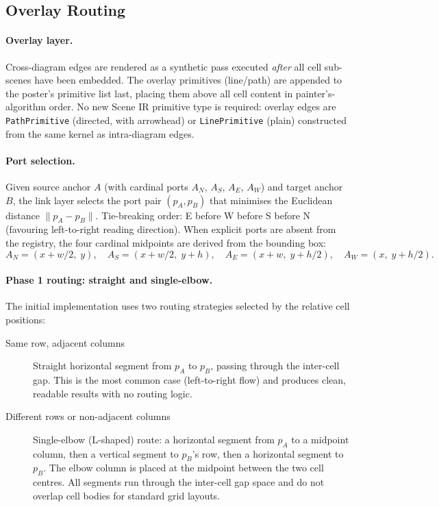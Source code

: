 \subsection{Overlay Routing}
\label{sec:cdl-overlay-routing}

\paragraph{Overlay layer.}

Cross-diagram edges are rendered as a synthetic pass executed \emph{after} all
cell sub-scenes have been embedded.  The overlay primitives (line/path) are
appended to the poster's primitive list last, placing them above all cell
content in painter's-algorithm order.  No new Scene IR primitive type is
required: overlay edges are \texttt{PathPrimitive} (directed, with arrowhead)
or \texttt{LinePrimitive} (plain) constructed from the same kernel as
intra-diagram edges.

\paragraph{Port selection.}

Given source anchor $A$ (with cardinal ports $A_N$, $A_S$, $A_E$, $A_W$) and
target anchor $B$, the link layer selects the port pair $(p_A, p_B)$ that
minimises the Euclidean distance $\|p_A - p_B\|$.  Tie-breaking order: E
before W before S before N (favouring left-to-right reading direction).  When
explicit ports are absent from the registry, the four cardinal midpoints are
derived from the bounding box:
\[
  A_N = (x + w/2,\; y), \quad
  A_S = (x + w/2,\; y+h), \quad
  A_E = (x+w,\; y+h/2), \quad
  A_W = (x,\; y+h/2).
\]

\paragraph{Phase 1 routing: straight and single-elbow.}

The initial implementation uses two routing strategies selected by the
relative cell positions:

\begin{description}
  \item[Same row, adjacent columns] Straight horizontal segment from $p_A$
        to $p_B$, passing through the inter-cell gap.  This is the most common
        case (left-to-right flow) and produces clean, readable results with no
        routing logic.

  \item[Different rows or non-adjacent columns] Single-elbow (L-shaped) route:
        a horizontal segment from $p_A$ to a midpoint column, then a vertical
        segment to $p_B$'s row, then a horizontal segment to $p_B$.  The
        elbow column is placed at the midpoint between the two cell centres.
        All segments run through the inter-cell gap space and do not overlap
        cell bodies for standard grid layouts.
\end{description}

